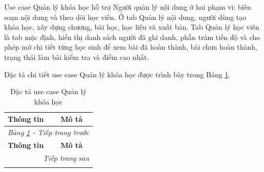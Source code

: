 ﻿\documentclass[../DoAn.tex]{subfiles}
\begin{document}
Use case Quản lý khóa học hỗ trợ Người quản lý nội dung ở hai phạm vi: biên soạn nội dung và theo dõi học viên. Ở tab Quản lý nội dung, người dùng tạo khóa học, xây dựng chương, bài học, học liệu và xuất bản. Tab Quản lý học viên là tab mặc định, hiển thị danh sách người đã ghi danh, phần trăm tiến độ và cho phép mở chi tiết từng học sinh để xem bài đã hoàn thành, bài chưa hoàn thành, trạng thái làm bài kiểm tra và điểm cao nhất.

Đặc tả chi tiết use case Quản lý khóa học được trình bày trong Bảng \ref{table:uc01_quan_ly_khoa_hoc}.

\begingroup
\small
\renewcommand{\arraystretch}{1.15}
\setlength{\LTpre}{0pt}
\setlength{\LTpost}{0pt}
\begin{longtable}{|p{3.5cm}|p{10.5cm}|}
\caption{Đặc tả use case Quản lý khóa học}
\label{table:uc01_quan_ly_khoa_hoc} \\
\hline
\textbf{Thông tin} & \textbf{Mô tả} \\ \hline
\endfirsthead

\hline
\multicolumn{2}{|c|}{\textit{Bảng \ref{table:uc01_quan_ly_khoa_hoc} - Tiếp trang trước}} \\ \hline
\textbf{Thông tin} & \textbf{Mô tả} \\ \hline
\endhead

\hline
\multicolumn{2}{|r|}{\textit{Tiếp trang sau}} \\ \hline
\endfoot

\hline
\endlastfoot


\end{longtable}
\end{document}
